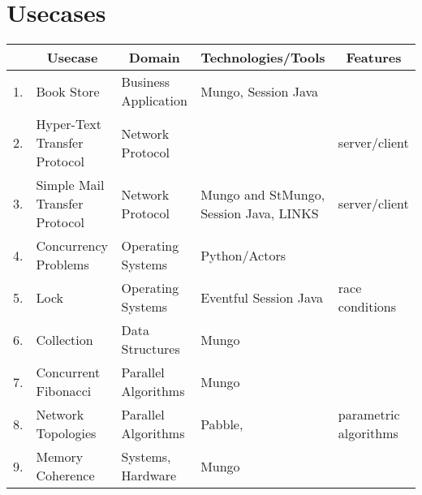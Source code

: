 \section{Usecases}

\begin{longtable}{|l|p{3.2cm}|p{3cm}|p{3.2cm}|p{2cm}|}
	\hline
		&	\multicolumn{1}{c|}{Usecase}
						&	\multicolumn{1}{c|}{Domain}
													&	\multicolumn{1}{c|}{Technologies/Tools}
																				&	\multicolumn{1}{c|}{Features}
	\\

	\hline
	1.	&	Book Store	&	Business Application	&	Mungo, Session Java		&
	\\

	\hline
	2.	&	Hyper-Text Transfer Protocol
						&	Network Protocol		&							&	server/client
	\\

	\hline
	3.	&	Simple Mail Transfer Protocol
						&	Network Protocol		&	Mungo and StMungo, Session Java, LINKS
																				&	server/client
	\\
	\hline
	4.	&	Concurrency	Problems
						&	Operating Systems		&	Python/Actors			&
	\\
	\hline
	5.	&	Lock		&	Operating Systems		&	Eventful Session Java	&	race conditions
	\\

	\hline
	6.	&	Collection	&	Data Structures			&	Mungo					&
	\\

	\hline
	7.	&	Concurrent Fibonacci
					&	Parallel Algorithms		&	Mungo						&
	\\

	\hline
	8.	&	Network Topologies
					&	Parallel Algorithms		&	Pabble, \dk{session MPI}	&	parametric algorithms
	\\

	\hline
	9.	&	Memory Coherence
					&	Systems, Hardware		&	Mungo						&	
	\\
	\hline
\end{longtable}
